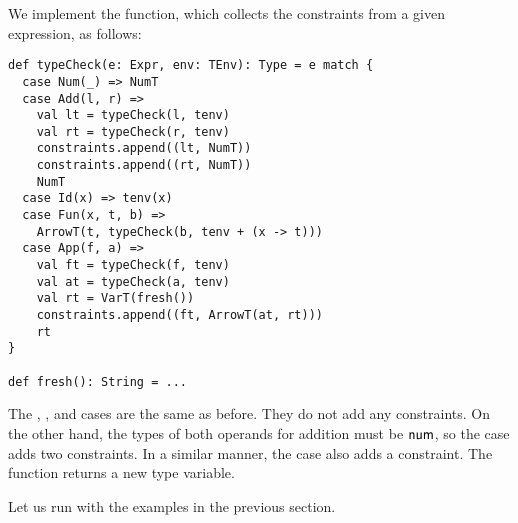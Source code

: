 We implement the  function, which collects the constraints
from a given expression, as follows:

\begin{verbatim}
def typeCheck(e: Expr, env: TEnv): Type = e match {
  case Num(_) => NumT
  case Add(l, r) =>
    val lt = typeCheck(l, tenv)
    val rt = typeCheck(r, tenv)
    constraints.append((lt, NumT))
    constraints.append((rt, NumT))
    NumT
  case Id(x) => tenv(x)
  case Fun(x, t, b) =>
    ArrowT(t, typeCheck(b, tenv + (x -> t)))
  case App(f, a) =>
    val ft = typeCheck(f, tenv)
    val at = typeCheck(a, tenv)
    val rt = VarT(fresh())
    constraints.append((ft, ArrowT(at, rt)))
    rt
}

def fresh(): String = ...
\end{verbatim}

The , , and  cases are the same as before. They do
not add any constraints. On the other hand, the types of both operands for
addition must be $\textsf{num}$, so the  case adds two constraints. In a
similar manner, the  case also adds a constraint. The 
function returns a new type variable.

Let us run  with the examples in the previous section.

